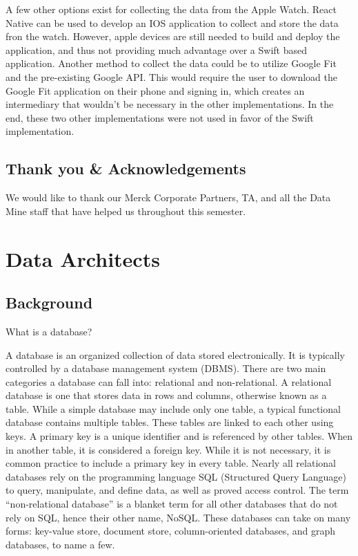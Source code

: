 \documentclass[]{book}
\begin{document}
A few other options exist for collecting the data from the Apple Watch.
React Native can be used to develop an IOS application to collect and
store the data fron the watch. However, apple devices are still needed
to build and deploy the application, and thus not providing much
advantage over a Swift based application. Another method to collect the
data could be to utilize Google Fit and the pre-existing Google API.
This would require the user to download the Google Fit application on
their phone and signing in, which creates an intermediary that wouldn't
be necessary in the other implementations. In the end, these two other
implementations were not used in favor of the Swift implementation.

\section{Thank you \&
Acknowledgements}\label{thank-you-acknowledgements}

We would like to thank our Merck Corporate Partners, TA, and all the
Data Mine staff that have helped us throughout this semester.

\chapter{Data Architects}\label{data-architects}

\section{Background}\label{background}

What is a database?

A database is an organized collection of data stored electronically. It
is typically controlled by a database management system (DBMS). There
are two main categories a database can fall into: relational and
non-relational. A relational database is one that stores data in rows
and columns, otherwise known as a table. While a simple database may
include only one table, a typical functional database contains multiple
tables. These tables are linked to each other using keys. A primary key
is a unique identifier and is referenced by other tables. When in
another table, it is considered a foreign key. While it is not
necessary, it is common practice to include a primary key in every
table. Nearly all relational databases rely on the programming language
SQL (Structured Query Language) to query, manipulate, and define data,
as well as proved access control. The term ``non-relational database''
is a blanket term for all other databases that do not rely on SQL, hence
their other name, NoSQL. These databases can take on many forms:
key-value store, document store, column-oriented databases, and graph
databases, to name a few.
\end{document}
